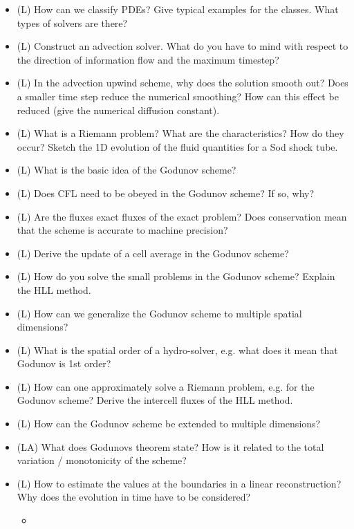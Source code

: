 \begin{itemize}
    \item (L) How can we classify PDEs? Give typical examples for the classes. What types of solvers are there?
    \item (L) Construct an advection solver. What do you have to mind with respect to the 
    direction of information flow and the maximum timestep?
    \item (L) In the advection upwind scheme, why does the solution smooth out? Does a smaller
    time step reduce the numerical smoothing? How can this effect be reduced (give the numerical 
    diffusion constant).
    \item (L) What is a Riemann problem? What are the characteristics? How do they occur? Sketch the 1D evolution of the fluid quantities for a Sod shock tube.
    \item (L) What is the basic idea of the Godunov scheme?
    \item (L) Does CFL need to be obeyed in the Godunov scheme? If so, why?
    \item (L) Are the fluxes exact fluxes of the exact problem? Does conservation mean that the scheme is accurate to machine precision?
    \item (L) Derive the update of a cell average in the Godunov scheme?
    \item (L) How do you solve the small problems in the Godunov scheme? Explain the HLL method.
    \item (L) How can we generalize the Godunov scheme to multiple spatial dimensions?
    \item (L) What is the spatial order of a hydro-solver, e.g. what does it mean that Godunov is 1st order?
    \item (L) How can one approximately solve a Riemann problem, e.g. for the Godunov scheme? Derive the intercell fluxes of the HLL method.
    \item (L) How can the Godunov scheme be extended to multiple dimensions?
    \item (LA) What does Godunovs theorem state? How is it related to the total variation / monotonicity of the scheme?
    \item (L) How to estimate the values at the boundaries in a linear reconstruction? Why does the evolution in time have to be considered?
    \begin{itemize}
        \item {}
\end{itemize}
\end{itemize}
